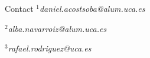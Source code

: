 \documentclass[final]{beamer}
\newlength{\sepmargin}
\newlength{\onecolwid}
\begin{document}
\begin{frame}[t]
\begin{columns}[t]
\begin{column}{\onecolwid}
      \begin{block}{\large Contact}
        \vspace*{-0.5cm}
        \footnotesize
        $^1$\emph{daniel.acostsoba@alum.uca.es}

        $^2$\emph{alba.navarroiz@alum.uca.es}

        $^3$\emph{rafael.rodriguez@uca.es}
      \end{block}
    \end{column}

    \begin{column}{\sepmargin}\end{column} %



  \end{columns} %

\end{frame} %
\end{document}
